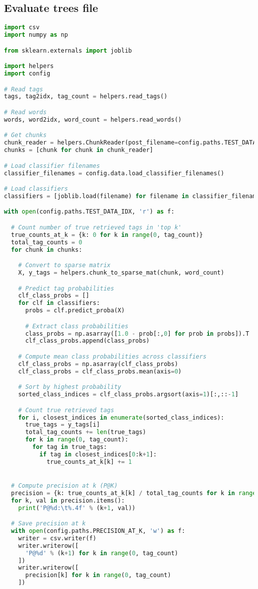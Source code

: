 \subsection{Evaluate trees file}
\label{app:eval-tree}

\begin{lstlisting}[language=python]
import csv
import numpy as np

from sklearn.externals import joblib

import helpers
import config

# Read tags
tags, tag2idx, tag_count = helpers.read_tags()

# Read words
words, word2idx, word_count = helpers.read_words()

# Get chunks
chunk_reader = helpers.ChunkReader(post_filename=config.paths.TEST_DATA_IDX, chunk_size=config.data.CHUNK_SIZE_TREES)
chunks = [chunk for chunk in chunk_reader]

# Load classifier filenames
classifier_filenames = config.data.load_classifier_filenames()

# Load classifiers
classifiers = [joblib.load(filename) for filename in classifier_filenames]

with open(config.paths.TEST_DATA_IDX, 'r') as f:

  # Count number of true retrieved tags in 'top k'
  true_counts_at_k = {k: 0 for k in range(0, tag_count)}
  total_tag_counts = 0
  for chunk in chunks:

    # Convert to sparse matrix
    X, y_tags = helpers.chunk_to_sparse_mat(chunk, word_count)

    # Predict tag probabilities
    clf_class_probs = []
    for clf in classifiers:
      probs = clf.predict_proba(X)

      # Extract class probabilities
      class_probs = np.asarray([1.0 - prob[:,0] for prob in probs]).T
      clf_class_probs.append(class_probs)

    # Compute mean class probabilities across classifiers
    clf_class_probs = np.asarray(clf_class_probs)
    clf_class_probs = clf_class_probs.mean(axis=0)

    # Sort by highest probability
    sorted_class_indices = clf_class_probs.argsort(axis=1)[:,::-1]

    # Count true retrieved tags
    for i, closest_indices in enumerate(sorted_class_indices):
      true_tags = y_tags[i]
      total_tag_counts += len(true_tags)
      for k in range(0, tag_count):
        for tag in true_tags:
          if tag in closest_indices[0:k+1]:
            true_counts_at_k[k] += 1


  # Compute precision at k (P@K)
  precision = {k: true_counts_at_k[k] / total_tag_counts for k in range(0, tag_count)}
  for k, val in precision.items():
    print('P@%d:\t%.4f' % (k+1, val))

  # Save precision at k
  with open(config.paths.PRECISION_AT_K, 'w') as f:
    writer = csv.writer(f)
    writer.writerow([
      'P@%d' % (k+1) for k in range(0, tag_count)
    ])
    writer.writerow([
      precision[k] for k in range(0, tag_count)
    ])
\end{lstlisting}
